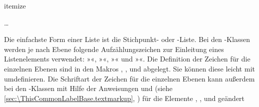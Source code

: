   \begin{Declaration}
    \begin{Environment}{itemize}
      \begin{Body}
         \dots
        \BodyDots
      \end{Body}
    \end{Environment}
  \end{Declaration}%
  Die einfachste
  Form einer Liste ist die Stichpunkt- oder
  -Liste. %
  %
  Bei den \KOMAScript-Klassen werden je nach Ebene folgende Aufzählungszeichen
  zur Einleitung eines Listenelements verwendet: »{}«,
  »{}«, »{}« und »{}«. Die Definition der
  Zeichen für die einzelnen Ebenen sind in den Makros ,
  ,  und 
  abgelegt. Sie können diese leicht mit  umdefinieren.
  Die Schriftart der Zeichen für die einzelnen
  Ebenen kann außerdem bei den \KOMAScript-Klassen mit Hilfe der Anweisungen
   und
   (siehe
  \autoref{sec:\ThisCommonLabelBase.textmarkup},
  ) für die Elemente
  ,
  ,
   und
   geändert
